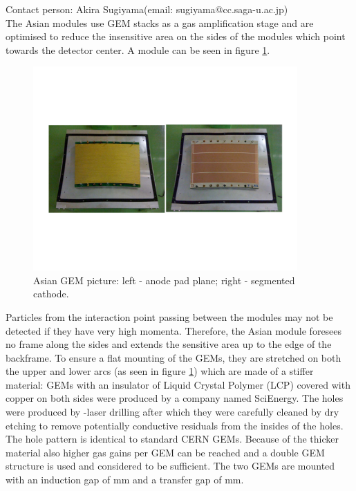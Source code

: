 \label{chap:TPC_sec:asian_gems}
Contact person: Akira Sugiyama(email: sugiyama@cc.saga-u.ac.jp)\\


The Asian modules use GEM stacks as a gas amplification stage and are optimised to reduce the insensitive area
on the sides of the modules which point towards the detector center.
A module can be seen in figure \ref{fig_Fig1asiangempicture}.

\begin{figure}[!htb]
  \centering
  \includegraphics[width=0.9\textwidth]{Tracker/TPC_Bonn/plots/TPC-AG_Fig1asaingempicture.pdf}
  \caption{Asian GEM picture: left - anode pad plane; right - segmented cathode.}
  \label{fig_Fig1asiangempicture}
\end{figure}

Particles from the interaction point passing
between the modules may not be detected if they have very high momenta. Therefore, the Asian module foresees no frame along
the sides and extends the sensitive
area up to the edge of the backframe. To ensure a flat mounting of the GEMs, they are stretched on both the upper
and lower arcs (as seen in figure \ref{fig_Fig1asiangempicture}) which are made of a stiffer material:
GEMs with an insulator of \unit[100]{\micron} Liquid Crystal Polymer (LCP)
covered with \unit[5]{\micron} copper on both sides were produced by a company named SciEnergy.
The holes were
produced by -laser drilling after which they were carefully cleaned by dry etching to remove potentially
conductive residuals from the insides of the holes. The
hole pattern is identical to standard CERN GEMs. Because of the thicker material also higher gas gains per GEM
can be reached and a double GEM
structure is used and considered to be sufficient.
The two GEMs are mounted with an induction gap of \unit[2]{mm} and a transfer gap of \unit[3]{mm}.

